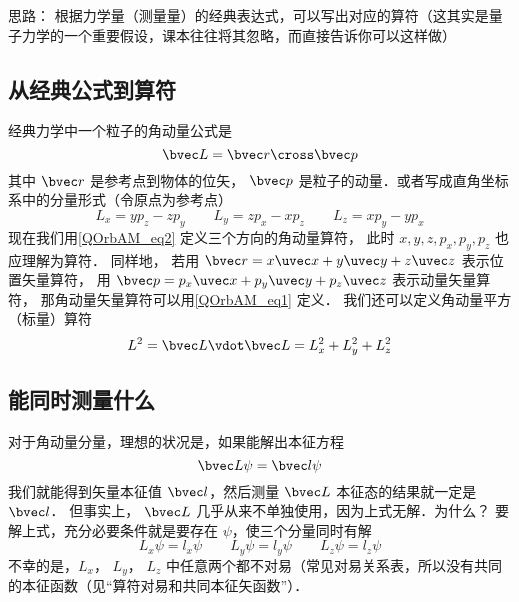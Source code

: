 

思路： 根据力学量（测量量）的经典表达式，可以写出对应的算符（这其实是量子力学的一个重要假设，课本往往将其忽略，而直接告诉你可以这样做）

\subsection{从经典公式到算符}

经典力学中一个粒子的角动量公式是
\begin{equation}\label{QOrbAM_eq1}
\bvec L = \bvec r \cross \bvec p
\end{equation}
其中 $\bvec r$ 是参考点到物体的位矢， $\bvec p$ 是粒子的动量．或者写成直角坐标系中的分量形式（令原点为参考点）
\begin{equation}\label{QOrbAM_eq2}
L_x = y p_z - z p_y \qquad
L_y = z p_x - x p_z \qquad
L_z = x p_y - y p_x
\end{equation}   
现在我们用\autoref{QOrbAM_eq2} 定义三个方向的角动量算符， 此时 $x, y, z, p_x, p_y, p_z$ 也应理解为算符． 同样地， 若用 $\bvec r = x\uvec x + y\uvec y + z\uvec z$ 表示位置矢量算符， 用 $\bvec p = p_x \uvec x + p_y\uvec y + p_z\uvec z$ 表示动量矢量算符， 那角动量矢量算符可以用\autoref{QOrbAM_eq1} 定义． 我们还可以定义角动量平方（标量）算符
\begin{equation}
L^2 = \bvec L \vdot \bvec L = L_x^2 + L_y^2 + L_z^2
\end{equation}

\subsection{能同时测量什么}

对于角动量分量，理想的状况是，如果能解出本征方程
\begin{equation}
\bvec L \psi  = \bvec l\psi 
\end{equation}
我们就能得到矢量本征值 $\bvec l$，然后测量 $\bvec L$ 本征态的结果就一定是 $\bvec l$． 但事实上， $\bvec L$ 几乎从来不单独使用，因为上式无解．为什么？ 要解上式，充分必要条件就是要存在 $\psi$，使三个分量同时有解
\begin{equation}
L_x \psi  = l_x \psi \qquad
L_y \psi  = l_y \psi \qquad
L_z \psi  = l_z \psi 
\end{equation}   
不幸的是，$L_x$， $L_y$， $L_z$ 中任意两个都不对易（常见对易关系表，所以没有共同的本征函数（见“算符对易和共同本征矢函数”）．

